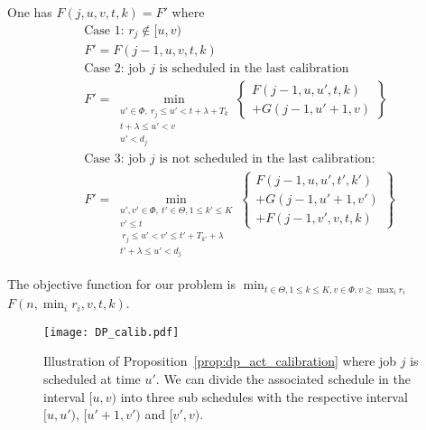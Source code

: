 \begin{prop}\label{prop:dp_act_calibration}
One has $F(j,u,v,t,k)=F'$ where
\begin{align*}
&\mbox{Case 1: } r_j\notin [u,v)\\
&F'=F(j-1,u,v,t,k)\\
&\mbox{Case 2: job $j$ is scheduled in the last calibration}\\
&F'=\min_{\substack{
	u'\in \Phi,~r_j\leq u'<t+\lambda+T_{k}\\
	t+\lambda \leq u' < v\\
	u'<d_j}}
	\left\{
	\begin{array}{r}
	F(j-1,u,u',t,k) \\ + G(j-1,u'+1,v)
	\end{array}
	\right\}
	\\
&\mbox{Case 3: job $j$ is not scheduled in the last calibration: }\\
&F'=\min_{\substack{
	u' , v' \in \Phi,~t'\in \Theta, 1\leq k'\leq K\\
	v'\leq t\\
	~r_j\leq u'<v' \leq t'+T_{k'}+\lambda\\
	t'+\lambda \leq u' < d_j
	}}
	\left\{
\begin{array}{c}
F(j-1,u,u',t',k')\\
+G(j-1,u'+1,v')\\
+F(j-1,v',v,t,k)
\end{array}
\right\}
\end{align*}
\end{prop}

The objective function for our problem is
$\min_{t\in \Theta, 1\leq k \leq K,v\in \Phi, v \geq \max_i r_i } $ $F(n,\min_i r_i,v,t,k)$.

\begin{figure*}[h!]
\centering
\texttt{[image: DP\_calib.pdf]}
\caption{Illustration of Proposition~\ref{prop:dp_act_calibration} where job $j$ is scheduled at time $u'$. We can divide the associated schedule in the interval $[u,v)$ into three sub schedules with the respective interval $[u,u')$, $[u'+1,v')$ and $[v',v)$.}
\label{fig:dp_calibration}
\end{figure*}



